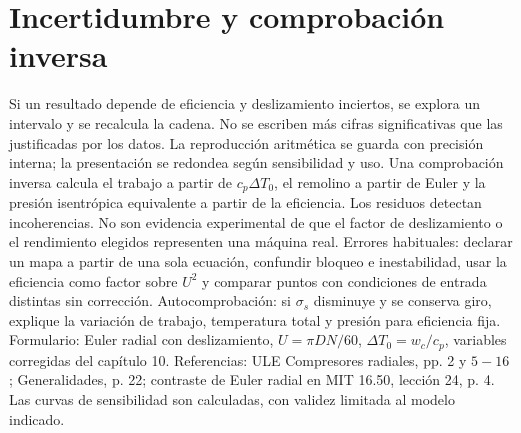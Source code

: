 \documentclass[10pt,openany]{book}
\begin{document}
\section{Incertidumbre y comprobación inversa}

Si un resultado depende de eficiencia y deslizamiento inciertos, se explora un intervalo y se recalcula la cadena. No se escriben más cifras significativas que las justificadas por los datos. La reproducción aritmética se guarda con precisión interna; la presentación se redondea según sensibilidad y uso.
Una comprobación inversa calcula el trabajo a partir de \(c_p\Delta T_0\), el remolino a partir de Euler y la presión isentrópica equivalente a partir de la eficiencia. Los residuos detectan incoherencias. No son evidencia experimental de que el factor de deslizamiento o el rendimiento elegidos representen una máquina real.
Errores habituales: declarar un mapa a partir de una sola ecuación, confundir bloqueo e inestabilidad, usar la eficiencia como factor sobre \(U^2\) y comparar puntos con condiciones de entrada distintas sin corrección. Autocomprobación: si \(\sigma_s\) disminuye y se conserva giro, explique la variación de trabajo, temperatura total y presión para eficiencia fija.
Formulario: Euler radial con deslizamiento, \(U=\pi DN/60\), \(\Delta T_0=w_c/c_p\), variables corregidas del capítulo 10. Referencias: ULE Compresores radiales, pp. 2 y \(5-16\); Generalidades, p. 22; contraste de Euler radial en MIT 16.50, lección 24, p. 4. Las curvas de sensibilidad son calculadas, con validez limitada al modelo indicado.
\end{document}
